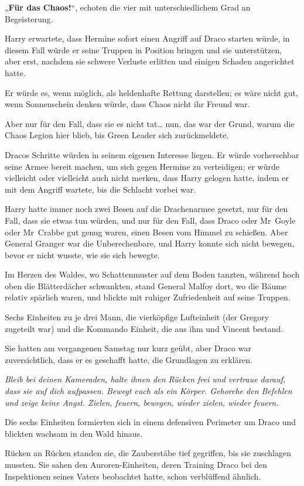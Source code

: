 {„\textbf{Für das Chaos!}“, echoten die vier mit unterschiedlichem Grad an Begeisterung.

Harry erwartete, dass Hermine sofort einen Angriff auf Draco starten würde, in diesem Fall würde er seine Truppen in Position bringen und sie unterstützen, aber erst, nachdem sie schwere Verluste erlitten und einigen Schaden angerichtet hatte.

Er würde es, wenn möglich, als heldenhafte Rettung darstellen; es wäre nicht gut, wenn Sonnenschein denken würde, dass Chaos nicht ihr Freund war.

Aber nur für den Fall, dass sie es nicht tat… nun, das war der Grund, warum die Chaos Legion hier blieb, bis Green Leader sich zurückmeldete.

Dracos Schritte würden in seinem eigenen Interesse liegen. Er würde vorhersehbar seine Armee bereit machen, um sich gegen Hermine zu verteidigen; er würde vielleicht oder vielleicht auch nicht merken, dass Harry gelogen hatte, indem er mit dem Angriff wartete, bis die Schlacht vorbei war.

Harry hatte immer noch zwei Besen auf die Drachenarmee gesetzt, nur für den Fall, dass sie etwas tun würden, und nur für den Fall, dass Draco oder Mr~Goyle oder Mr~Crabbe gut genug waren, einen Besen vom Himmel zu schießen. Aber General Granger war die Unberechenbare, und Harry konnte sich nicht bewegen, bevor er nicht wusste, wie sie sich bewegte.

Im Herzen des Waldes, wo Schattenmuster auf dem Boden tanzten, während hoch oben die Blätterdächer schwankten, stand General Malfoy dort, wo die Bäume relativ spärlich waren, und blickte mit ruhiger Zufriedenheit auf seine Truppen.

Sechs Einheiten zu je drei Mann, die vierköpfige Lufteinheit (der Gregory zugeteilt war) und die Kommando Einheit, die aus ihm und Vincent bestand.

Sie hatten am vergangenen Samstag nur kurz geübt, aber Draco war zuversichtlich, dass er es geschafft hatte, die Grundlagen zu erklären.

\emph{Bleib bei deinen Kameraden, halte ihnen den Rücken frei und vertraue darauf, dass sie auf dich aufpassen. Bewegt euch als ein Körper. Gehorche den Befehlen und zeige keine Angst. Zielen, feuern, bewegen, wieder zielen, wieder feuern.}

Die sechs Einheiten formierten sich in einem defensiven Perimeter um Draco und blickten wachsam in den Wald hinaus.

Rücken an Rücken standen sie, die Zauberstäbe tief gegriffen, bis sie zuschlagen mussten. Sie sahen den Auroren-Einheiten, deren Training Draco bei den Inspektionen seines Vaters beobachtet hatte, schon verblüffend ähnlich.

}

